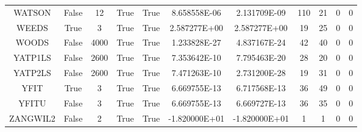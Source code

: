 \begin{longtable}{ccccccccccc}
	\cellcolor{default2} WATSON& \cellcolor{default2} False& \cellcolor{default2} 12& \cellcolor{default2} True& \cellcolor{default2} True& \cellcolor{ok} 8.658558E-06& \cellcolor{best} 2.131709E-09& \cellcolor{poor} 110& \cellcolor{best} 21& \cellcolor{default2} 0& \cellcolor{default2} 0\\
	\cellcolor{default1} WEEDS& \cellcolor{default1} True& \cellcolor{default1} 3& \cellcolor{default1} True& \cellcolor{default1} True& \cellcolor{ok} 2.587277E+00& \cellcolor{best} 2.587277E+00& \cellcolor{best} 19& \cellcolor{ok} 25& \cellcolor{default1} 0& \cellcolor{default1} 0\\
	\cellcolor{default2} WOODS& \cellcolor{default2} False& \cellcolor{default2} 4000& \cellcolor{default2} True& \cellcolor{default2} True& \cellcolor{best} 1.233828E-27& \cellcolor{ok} 4.837167E-24& \cellcolor{ok} 42& \cellcolor{best} 40& \cellcolor{default2} 0& \cellcolor{default2} 0\\
	\cellcolor{default1} YATP1LS& \cellcolor{default1} False& \cellcolor{default1} 2600& \cellcolor{default1} True& \cellcolor{default1} True& \cellcolor{ok} 7.353642E-10& \cellcolor{best} 7.795463E-20& \cellcolor{ok} 28& \cellcolor{best} 20& \cellcolor{default1} 0& \cellcolor{default1} 0\\
	\cellcolor{default2} YATP2LS& \cellcolor{default2} False& \cellcolor{default2} 2600& \cellcolor{default2} True& \cellcolor{default2} True& \cellcolor{ok} 7.471263E-10& \cellcolor{best} 2.731200E-28& \cellcolor{best} 19& \cellcolor{ok} 31& \cellcolor{default2} 0& \cellcolor{default2} 0\\
	\cellcolor{default1} YFIT& \cellcolor{default1} True& \cellcolor{default1} 3& \cellcolor{default1} True& \cellcolor{default1} True& \cellcolor{best} 6.669755E-13& \cellcolor{ok} 6.717568E-13& \cellcolor{best} 36& \cellcolor{ok} 49& \cellcolor{default1} 0& \cellcolor{default1} 0\\
	\cellcolor{default2} YFITU& \cellcolor{default2} False& \cellcolor{default2} 3& \cellcolor{default2} True& \cellcolor{default2} True& \cellcolor{ok} 6.669755E-13& \cellcolor{best} 6.669727E-13& \cellcolor{ok} 36& \cellcolor{best} 35& \cellcolor{default2} 0& \cellcolor{default2} 0\\
	\cellcolor{default1} ZANGWIL2& \cellcolor{default1} False& \cellcolor{default1} 2& \cellcolor{default1} True& \cellcolor{default1} True& \cellcolor{best} -1.820000E+01& \cellcolor{ok} -1.820000E+01& \cellcolor{best} 1& \cellcolor{best} 1& \cellcolor{default1} 0& \cellcolor{default1} 0\\

\end{longtable}
